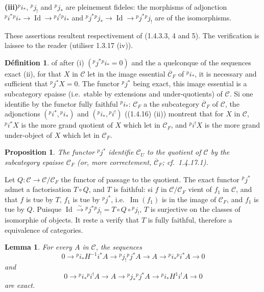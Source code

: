 \documentclass[12pt,a4paper]{article}
\theoremstyle{plain}
\newtheorem{lemma}[theorem]{Lemma}
\newtheorem{proposition}[theorem]{Proposition}
\theoremstyle{definition}
\newtheorem{definition}[theorem]{D\'efinition}
\DeclareMathOperator{\im}{Im}
\DeclareMathOperator{\Id}{Id}
\begin{document}
\smallskip
\noindent\textbf{(iii)}\quad ${}^p i_*$, ${}^p j_!$ and ${}^p j_*$ are pleinement fideles: the morphisms of adjonction ${}^p i^* {}^p i_* \to \Id \to {}^p i^! {}^p i_*$ and ${}^p j^* {}^p j_* \to \Id \to {}^p j^* {}^p j_!$ are of the isomorphisms.

These assertions resultent respectivement of (1.4.3.3, 4 and 5). The verification is laissee to the reader (utiliser 1.3.17 (iv)).

\begin{definition}\label{def:1.4.17.1}
of after (i) $({}^p j^* {}^p i_* = 0)$ and the a quelconque of the sequences exact (ii), for that $X$ in $\mathcal{C}$ let in the image essential $\overline{\mathcal{C}}_F$ of ${}^p i_*$, it is necessary and sufficient that ${}^p j^* X = 0$. The functor ${}^p j^*$ being exact, this image essential is a subcategory epaisse (i.e.\ stable by extensions and under-quotients) of $\mathcal{C}$. Si one identifie by the functor fully faithful ${}^p i_*$: $\mathcal{C}_F$ a the subcategory $\overline{\mathcal{C}}_F$ of $\mathcal{C}$, the adjonctions $({}^p i^*, {}^p i_*)$ and $({}^p i_*, {}^p i^!)$ ((1.4.16) (ii)) montrent that for $X$ in $\mathcal{C}$, ${}^p i^* X$ is the more grand quotient of $X$ which let in $\mathcal{C}_F$, and ${}^p i^! X$ is the more grand under-object of $X$ which let in $\mathcal{C}_F$.
\end{definition}

\begin{proposition}\label{prop:1.4.18}
The functor ${}^p j^*$ identifie $\mathcal{C}_U$ to the quotient of $\mathcal{C}$ by the subcategory epaisse $\mathcal{C}_F$ (or, more correctement, $\overline{\mathcal{C}}_F$; cf.~1.4.17.1).
\end{proposition}

Let $Q : \mathcal{C} \to \mathcal{C}/\mathcal{C}_F$ the functor of passage to the quotient. The exact functor ${}^p j^*$ admet a factorisation $T \circ Q$, and $T$ is faithful: si $f$ in $\mathcal{C}/\mathcal{C}_F$ vient of $f_1$ in $\mathcal{C}$, and that $f$ is tue by $T$, $f_1$ is tue by ${}^p j^*$, i.e.\ $\im(f_1)$ is in the image of $\mathcal{C}_F$, and $f_1$ is tue by $Q$. Puisque $\Id \xrightarrow{\sim} {}^p j^* {}^p j_! = T \circ Q \circ {}^p j_!$, $T$ is surjective on the classes of isomorphie of objects. It reste a verify that $T$ is fully faithful, therefore a equivalence of categories.

\begin{lemma}\label{lem:1.4.19}
For every $A$ in $\mathcal{C}$, the sequences
\[
0 \to {}^p i_* H^{-1} i^* A \to {}^p j_! {}^p j^* A \to A \to {}^p i_* {}^p i^* A \to 0
\]
and
\[
0 \to {}^p i_* {}^p i^! A \to A \to {}^p j_* {}^p j^* A \to {}^p i_* H^1 i^! A \to 0
\]
are exact.
\end{lemma}
\end{document}
